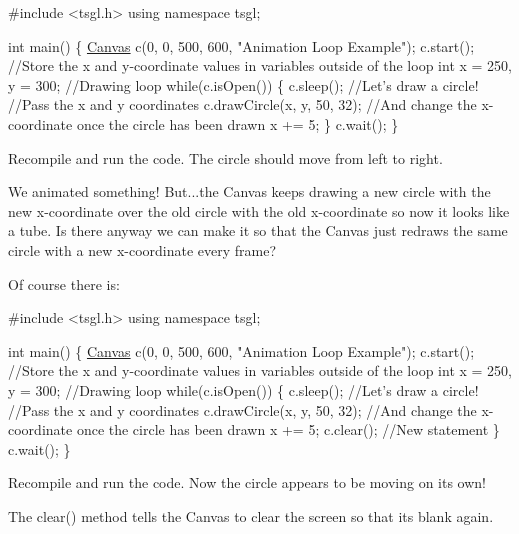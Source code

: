 \begin{DoxyCode}
\textcolor{preprocessor}{#include <tsgl.h>}
\textcolor{keyword}{using namespace }tsgl;

\textcolor{keywordtype}{int} main() \{
  \hyperlink{classtsgl_1_1_canvas}{Canvas} c(0, 0, 500, 600, \textcolor{stringliteral}{"Animation Loop Example"});
  c.start();
  \textcolor{comment}{//Store the x and y-coordinate values in variables outside of the loop}
  \textcolor{keywordtype}{int} x = 250, y = 300;
  \textcolor{comment}{//Drawing loop}
  \textcolor{keywordflow}{while}(c.isOpen()) \{
    c.sleep();
    \textcolor{comment}{//Let's draw a circle!}
    \textcolor{comment}{//Pass the x and y coordinates}
    c.drawCircle(x, y, 50, 32);
    \textcolor{comment}{//And change the x-coordinate once the circle has been drawn}
    x += 5;
  \}
  c.wait();
\}
\end{DoxyCode}
 Recompile and run the code. The circle should move from left to right.

We animated something! But...the Canvas keeps drawing a new circle with the new x-\/coordinate over the old circle with the old x-\/coordinate so now it looks like a tube. Is there anyway we can make it so that the Canvas just redraws the same circle with a new x-\/coordinate every frame?

Of course there is\-:


\begin{DoxyCode}
\textcolor{preprocessor}{#include <tsgl.h>}
\textcolor{keyword}{using namespace }tsgl;

\textcolor{keywordtype}{int} main() \{
  \hyperlink{classtsgl_1_1_canvas}{Canvas} c(0, 0, 500, 600, \textcolor{stringliteral}{"Animation Loop Example"});
  c.start();
  \textcolor{comment}{//Store the x and y-coordinate values in variables outside of the loop}
  \textcolor{keywordtype}{int} x = 250, y = 300;
  \textcolor{comment}{//Drawing loop}
  \textcolor{keywordflow}{while}(c.isOpen()) \{
    c.sleep();
    \textcolor{comment}{//Let's draw a circle!}
    \textcolor{comment}{//Pass the x and y coordinates}
    c.drawCircle(x, y, 50, 32);
    \textcolor{comment}{//And change the x-coordinate once the circle has been drawn}
    x += 5;
    c.clear(); \textcolor{comment}{//New statement}
  \}
  c.wait();
\}
\end{DoxyCode}


Recompile and run the code. Now the circle appears to be moving on its own!

The {\ttfamily clear()} method tells the Canvas to clear the screen so that its blank again.

